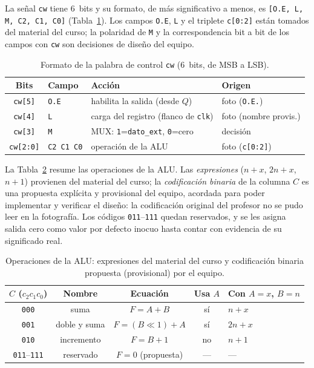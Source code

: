\documentclass[llncs]{llncs}
\begin{document}
La señal \texttt{cw} tiene 6~bits y su formato, de más significativo a
menos, es \texttt{[O.E, L, M, C2, C1, C0]}
(Tabla~\ref{tab:palabra-control}). Los
campos \texttt{O.E}, \texttt{L} y el triplete \texttt{c[0:2]} están
tomados del material del curso; la polaridad de \texttt{M} y la
correspondencia bit a bit de los campos con \texttt{cw} son decisiones de
diseño del equipo.

\begin{table}[t]
  \centering
  \caption{Formato de la palabra de control \texttt{cw} (6~bits, de MSB a
  LSB).}
  \label{tab:palabra-control}
  \footnotesize
  \begin{tabular}{clll}
    \hline
    Bits & Campo & Acción & Origen \\
    \hline
    \texttt{cw[5]} & \texttt{O.E} & habilita la salida (desde $Q$) &
      foto (\texttt{O.E.}) \\
    \texttt{cw[4]} & \texttt{L}   & carga del registro (flanco de
      \texttt{clk}) & foto (nombre provis.) \\
    \texttt{cw[3]} & \texttt{M}   & MUX: \texttt{1}=\texttt{dato\_ext},
      \texttt{0}=cero & decisión \\
    \texttt{cw[2:0]} & \texttt{C2 C1 C0} & operación de la ALU &
      foto (\texttt{c[0:2]}) \\
    \hline
  \end{tabular}
\end{table}

La Tabla~\ref{tab:alu} resume las operaciones de la ALU. Las
\emph{expresiones} ($n+x$, $2n+x$, $n+1$) provienen del material del
curso; la \emph{codificación binaria} de la columna $C$ es una propuesta
explícita y provisional del equipo, acordada para poder implementar y
verificar el diseño: la codificación original del profesor no se pudo leer
en la fotografía. Los códigos \texttt{011}--\texttt{111} quedan
reservados, y se les asigna salida cero como valor por defecto inocuo
hasta contar con evidencia de su significado real.

\begin{table}[t]
  \centering
  \caption{Operaciones de la ALU: expresiones del material del curso y
  codificación binaria propuesta (provisional) por el equipo.}
  \label{tab:alu}
  \footnotesize
  \begin{tabular}{ccccl}
    \hline
    $C$ ($c_2c_1c_0$) & Nombre & Ecuación & Usa $A$ &
      Con $A=x$, $B=n$ \\
    \hline
    \texttt{000} & suma           & $F = A + B$          & sí & $n + x$ \\
    \texttt{001} & doble y suma   & $F = (B \ll 1) + A$  & sí & $2n + x$ \\
    \texttt{010} & incremento     & $F = B + 1$          & no & $n + 1$ \\
    \texttt{011}--\texttt{111} & reservado & $F = 0$ (propuesta) & --- & --- \\
    \hline
  \end{tabular}
\end{table}
\end{document}
